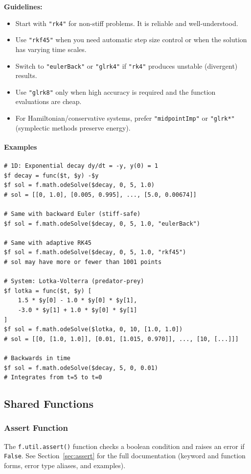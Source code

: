 \textbf{Guidelines:}
\begin{itemize}
\item Start with \texttt{"rk4"} for non-stiff problems. It is reliable and well-understood.
\item Use \texttt{"rkf45"} when you need automatic step size control or when the solution has varying time scales.
\item Switch to \texttt{"eulerBack"} or \texttt{"glrk4"} if \texttt{"rk4"} produces unstable (divergent) results.
\item Use \texttt{"glrk8"} only when high accuracy is required and the function evaluations are cheap.
\item For Hamiltonian/conservative systems, prefer \texttt{"midpointImp"} or \texttt{"glrk*"} (symplectic methods preserve energy).
\end{itemize}

\paragraph{Examples}
\begin{verbatim}
# 1D: Exponential decay dy/dt = -y, y(0) = 1
$f decay = func($t, $y) -$y
$f sol = f.math.odeSolve($decay, 0, 5, 1.0)
# sol = [[0, 1.0], [0.005, 0.995], ..., [5.0, 0.00674]]

# Same with backward Euler (stiff-safe)
$f sol = f.math.odeSolve($decay, 0, 5, 1.0, "eulerBack")

# Same with adaptive RK45
$f sol = f.math.odeSolve($decay, 0, 5, 1.0, "rkf45")
# sol may have more or fewer than 1001 points

# System: Lotka-Volterra (predator-prey)
$f lotka = func($t, $y) [
    1.5 * $y[0] - 1.0 * $y[0] * $y[1],
    -3.0 * $y[1] + 1.0 * $y[0] * $y[1]
]
$f sol = f.math.odeSolve($lotka, 0, 10, [1.0, 1.0])
# sol = [[0, [1.0, 1.0]], [0.01, [1.015, 0.970]], ..., [10, [...]]]

# Backwards in time
$f sol = f.math.odeSolve($decay, 5, 0, 0.01)
# Integrates from t=5 to t=0
\end{verbatim}

\subsection{Shared Functions}

\subsubsection{Assert Function}
The \texttt{f.util.assert()} function checks a boolean condition and raises an error if \texttt{False}. See Section~\ref{sec:assert} for the full documentation (keyword and function forms, error type aliases, and examples).

